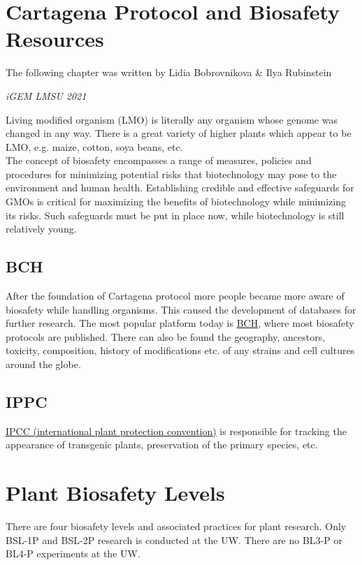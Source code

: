 \section{Cartagena Protocol and Biosafety Resources}
\epigraph{The following chapter was written by Lidia Bobrovnikova \& Ilya Rubinstein}{\textit{iGEM LMSU 2021}}
\noindent
Living modified organism (LMO) is literally any organism whose genome was changed in any way. There is a great variety of higher plants which appear to be LMO, e.g. maize, cotton, soya beans, etc. \\
The concept of biosafety encompasses a range of measures, policies and procedures for minimizing potential risks that biotechnology may pose to the environment and human health. Establishing credible and effective safeguards for GMOs is critical for maximizing the benefits of biotechnology while minimizing its risks. Such safeguards must be put in place now, while biotechnology is still relatively young. 

\subsection{BCH}
After the foundation of Cartagena protocol more people became more aware of biosafety while handling organisms. This caused the development of databases for further research. The most popular platform today is \href{https://bch.cbd.int/protocol/text/}{BCH}, where most biosafety protocols are published. There can also be found the geography, ancestors, toxicity, composition, history of modifications etc. of any strains and cell cultures around the globe. 

\subsection{IPPC}
\href{https://www.ippc.int}{IPCC (international plant protection convention)} is responsible for tracking the appearance of transgenic plants, preservation of the primary species, etc. 
 

\section{Plant Biosafety Levels}
There are four biosafety levels and associated practices for plant research. Only BSL-1P and BSL-2P research is conducted at the UW. There are no BL3-P or BL4-P experiments at the UW. 
